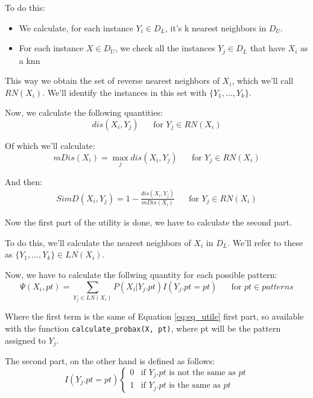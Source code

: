 To do this:
\begin{itemize}
    \item We calculate, for each instance $Y_i \in D_L$, it's k nearest neighbors in $D_U$.
    \item For each instance $X \in D_U$, we check all the instances $Y_j \in D_L$ that have $X_i$ 
    as a knn
\end{itemize}

This way we obtain the set of reverse nearest neighbors of $X_i$, which we'll call $RN(X_i)$. 
We'll identify the instances in this set with $\{Y_1 , \dots, Y_k\}$.

Now, we calculate the following quantities:
\begin{equation}
    dis(X_i, Y_j) 
    \, \, \, \, \, \, \,\,   \, \, 
    \text{for } Y_j \in RN(X_i)
\end{equation}

Of which we'll calculate:
\begin{equation}
    mDis(X_i) = \max_j dis(X_i, Y_j) 
    \, \, \, \, \, \, \,\,   \, \, 
    \text{for } Y_j \in RN(X_i)
\end{equation}

And then:
\begin{align}
    SimD(X_i, Y_j) = 1 - \frac{
        dis(X_i, Y_j)
    }{
        mDis(X_i)
    } 
    \, \, \, \, \, \, \,\,   \, \, 
    \text{for } Y_j \in RN(X_i)
\end{align}

Now the first part of the utility is done, we have to calculate the second part.

To do this, we'll calculate the nearest neighbors of $X_i$ in $D_L$.
We'll refer to these as $\{Y_1, \dots, Y_k\} \in LN(X_i)$.

Now, we have to calculate the follwing quantity for each possible pattern:
\begin{equation}
    \Psi(X_i, pt) = \sum_{Y_j \in LN(X_i)} P(X_i | Y_j.pt) I(Y_j.pt = pt)
    \, \, \, \, \, \, \,\,   \, \, 
    \text{for } pt \in patterns
\end{equation}

Where the first term is the same of Equation \ref{eq:eq_utile} first part, so available 
with the function \texttt{calculate\_probax(X, pt)}, where pt will be the pattern
assigned to $Y_j$.

The second part, on the other hand is defined as follows:
\begin{equation}
    I(Y_j.pt = pt)
    \begin{cases}
        0 & \text{if } Y_j.pt \text{ is not the same as } pt \\
        1 & \text{if } Y_j.pt \text{ is the same as } pt
    \end{cases}
\end{equation}


